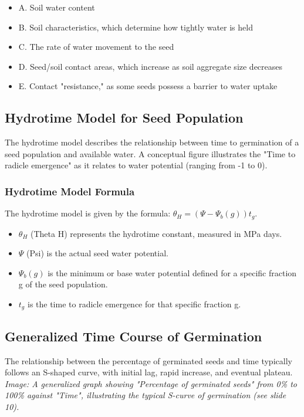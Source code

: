 \begin{itemize} 
    \item A. Soil water content 
    \item B. Soil characteristics, which determine how tightly water is held 
    \item C. The rate of water movement to the seed 
    \item D. Seed/soil contact areas, which increase as soil aggregate size decreases 
    \item E. Contact "resistance," as some seeds possess a barrier to water uptake 
\end{itemize}

\subsection{Hydrotime Model for Seed Population} 
The hydrotime model describes the relationship between time to germination of a seed population and available water. A conceptual figure illustrates the "Time to radicle emergence" as it relates to water potential (ranging from -1 to 0).

\subsubsection{Hydrotime Model Formula} 
The hydrotime model is given by the formula: $\theta_H = (\Psi - \Psi_b(g))t_g$. 

\begin{itemize} 
    \item $\theta_H$ (Theta H) represents the hydrotime constant, measured in MPa days. 
    \item $\Psi$ (Psi) is the actual seed water potential. 
    \item $\Psi_b(g)$ is the minimum or base water potential defined for a specific fraction g of the seed population. 
    \item $t_g$ is the time to radicle emergence for that specific fraction g. 
\end{itemize}

\subsection{Generalized Time Course of Germination} 
The relationship between the percentage of germinated seeds and time typically follows an S-shaped curve, with initial lag, rapid increase, and eventual plateau. \textit{Image: A generalized graph showing "Percentage of germinated seeds" from 0\% to 100\% against "Time", illustrating the typical S-curve of germination (see slide 10).}

